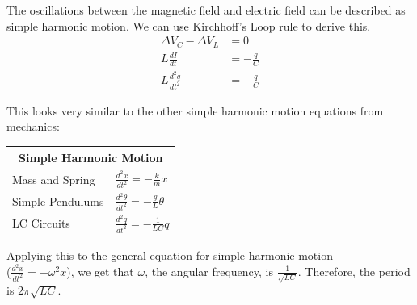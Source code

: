 \documentclass[12pt, titlepage]{article}
\begin{document}
The oscillations between the magnetic field and electric field can be described as simple harmonic motion. We can use Kirchhoff's Loop rule to derive this.
\begin{align*}
    \Delta V_C-\Delta V_L & = 0 \\
    L\frac{dI}{dt} &= -\frac{q}{C} \\
    L\frac{d^2q}{dt^2} &= -\frac{q}{C}
\end{align*}

This looks very similar to the other simple harmonic motion equations from mechanics:
\begin{center}
    \begin{tabular}{ |p{4cm}|p{6cm}| }
        \hline
        \multicolumn{2}{|c|}{Simple Harmonic Motion} \\
        \hline
        Mass and Spring & $\frac{d^2x}{dt^2} = -\frac{k}{m}x$ \\
        Simple Pendulums & $\frac{d^2\theta}{dt^2} = -\frac{g}{L} \theta $ \\
        LC Circuits & $\frac{d^2q}{dt^2} =-\frac{1}{LC}q$\\
        \hline
    \end{tabular}
\end{center}

Applying this to the general equation for simple harmonic motion \\ ($\frac{d^2x}{dt^2} = -\omega^2x$), we get that $\omega$, the angular frequency, is $\frac{1}{\sqrt{LC}}$. Therefore, the period is $2\pi \sqrt{LC}$.
\end{document}
